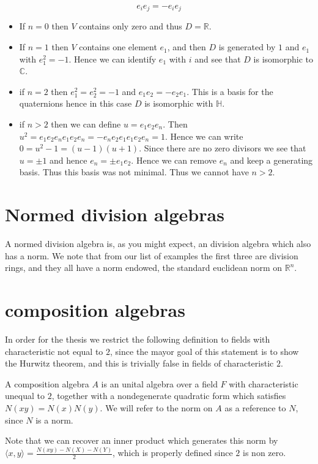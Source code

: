 \documentclass[../Thesis.tex]{subfiles}
\begin{document}
\begin{myproof}
\begin{equation}
e_ie_j = - e_ie_j
\end{equation}
\begin{itemize}
\item If $n = 0 $ then $V$ contains only zero and thus $D = \mathbb{R}$.
\item If $n = 1 $ then $V$ contains one element $e_1$, and then $D$ is generated by $1$ and $e_1$ with $e_1^2 = -1$. Hence we can identify $e_1$ with $i$ and see that $D$ is isomorphic to $\mathbb{C}$.
\item if $n = 2$ then $e_1^2 = e_2^2 = -1$ and $e_1e_2 = -e_2e_1$. This is a basis for the quaternions hence in this case $D$ is isomorphic with $\mathbb{H}$.
\item if $n > 2$ then we can define $u = e_1e_2e_n$. Then $u^2 = e_1e_2e_n e_1 e_2e_n = -e_ne_2e_1e_1e_2e_n = 1$. Hence we can write $0 = u^2 -1 = (u-1)(u+1)$. Since there are no zero divisors we see that $u = \pm 1$ and hence $e_n = \pm e_1e_2$. Hence we can remove $e_n$ and keep a generating basis. Thus this basis was not minimal. Thus we cannot have $n >2$.
\end{itemize}
\end{myproof}
\section{Normed division algebras}
A normed division algebra is, as you might expect, an division algebra which also has a norm. We note that from our list of examples the first three are division rings, and they all have a norm endowed, the standard euclidean norm on $\mathbb{R}^n$.
\section{composition algebras}
In order for the thesis we restrict the following definition to fields with characteristic not equal to $2$, since the mayor goal of this statement is to show the Hurwitz theorem, and this is trivially false in fields of characteristic $2$.
\begin{mydef}
A composition algebra $A$ is an unital algebra over a field $F$ with characteristic unequal to $2$, together with a nondegenerate quadratic form which satisfies $N(xy) = N(x)N(y)$. We will refer to the norm on $A$ as a reference to $N$, since $N$ is a norm.
\end{mydef}
Note that we can recover an inner product which generates this norm by $\langle x, y \rangle = \frac{N(xy) - N(X) - N(Y)}{2}$, which is properly defined since $2$ is non zero.
\end{document}

